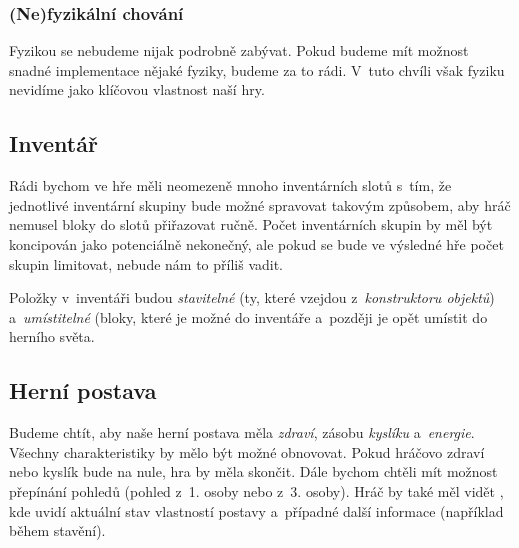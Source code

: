 \subsubsection{(Ne)fyzikální chování}

Fyzikou se nebudeme nijak podrobně zabývat. Pokud budeme mít možnost snadné implementace nějaké fyziky, budeme za to rádi. V~tuto chvíli však fyziku nevidíme jako klíčovou vlastnost naší hry. 

\subsection{Inventář}
\label{subsec:inventory}
Rádi bychom ve hře měli neomezeně mnoho inventárních slotů s~tím, že jednotlivé inventární skupiny bude možné spravovat takovým způsobem, aby hráč nemusel bloky do slotů přiřazovat ručně. Počet inventárních skupin by měl být koncipován jako potenciálně nekonečný, ale pokud se bude ve výsledné hře počet skupin limitovat, nebude nám to příliš vadit.

Položky v~inventáři budou \textit{stavitelné} (ty, které vzejdou z~\textit{konstruktoru objektů}) a~\textit{umístitelné} (bloky, které je možné  do inventáře a~později je opět umístit do herního světa.

\subsection{Herní postava}
\label{subsec:postava}
Budeme chtít, aby naše herní postava měla \textit{zdraví}, zásobu \textit{kyslíku} a~\textit{energie}. Všechny charakteristiky by mělo být možné obnovovat. Pokud hráčovo zdraví nebo kyslík bude na nule, hra by měla skončit. Dále bychom chtěli mít možnost přepínání pohledů (pohled z~1. osoby nebo z~3. osoby). Hráč by také měl vidět \HUD{}, kde uvidí aktuální stav vlastností postavy a~případné další informace (například během stavění).



